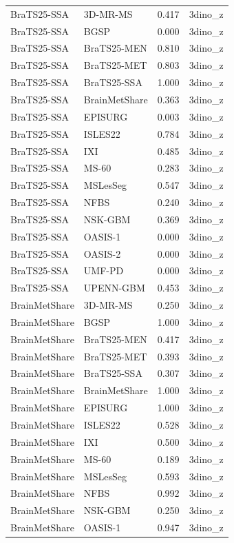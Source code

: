 \begin{tabular}{llrl}
BraTS25-SSA & 3D-MR-MS & 0.417 & 3dino\_z \\
BraTS25-SSA & BGSP & 0.000 & 3dino\_z \\
BraTS25-SSA & BraTS25-MEN & 0.810 & 3dino\_z \\
BraTS25-SSA & BraTS25-MET & 0.803 & 3dino\_z \\
BraTS25-SSA & BraTS25-SSA & 1.000 & 3dino\_z \\
BraTS25-SSA & BrainMetShare & 0.363 & 3dino\_z \\
BraTS25-SSA & EPISURG & 0.003 & 3dino\_z \\
BraTS25-SSA & ISLES22 & 0.784 & 3dino\_z \\
BraTS25-SSA & IXI & 0.485 & 3dino\_z \\
BraTS25-SSA & MS-60 & 0.283 & 3dino\_z \\
BraTS25-SSA & MSLesSeg & 0.547 & 3dino\_z \\
BraTS25-SSA & NFBS & 0.240 & 3dino\_z \\
BraTS25-SSA & NSK-GBM & 0.369 & 3dino\_z \\
BraTS25-SSA & OASIS-1 & 0.000 & 3dino\_z \\
BraTS25-SSA & OASIS-2 & 0.000 & 3dino\_z \\
BraTS25-SSA & UMF-PD & 0.000 & 3dino\_z \\
BraTS25-SSA & UPENN-GBM & 0.453 & 3dino\_z \\
BrainMetShare & 3D-MR-MS & 0.250 & 3dino\_z \\
BrainMetShare & BGSP & 1.000 & 3dino\_z \\
BrainMetShare & BraTS25-MEN & 0.417 & 3dino\_z \\
BrainMetShare & BraTS25-MET & 0.393 & 3dino\_z \\
BrainMetShare & BraTS25-SSA & 0.307 & 3dino\_z \\
BrainMetShare & BrainMetShare & 1.000 & 3dino\_z \\
BrainMetShare & EPISURG & 1.000 & 3dino\_z \\
BrainMetShare & ISLES22 & 0.528 & 3dino\_z \\
BrainMetShare & IXI & 0.500 & 3dino\_z \\
BrainMetShare & MS-60 & 0.189 & 3dino\_z \\
BrainMetShare & MSLesSeg & 0.593 & 3dino\_z \\
BrainMetShare & NFBS & 0.992 & 3dino\_z \\
BrainMetShare & NSK-GBM & 0.250 & 3dino\_z \\
BrainMetShare & OASIS-1 & 0.947 & 3dino\_z \\

\end{tabular}
